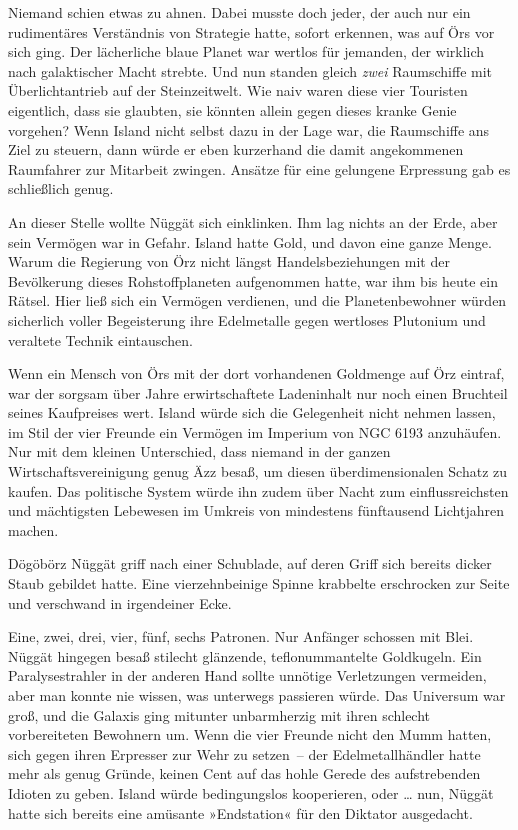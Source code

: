 Niemand schien etwas zu ahnen. Dabei musste doch jeder, der auch nur ein rudimentäres Verständnis von Strategie hatte, sofort erkennen, was auf Örs vor sich ging. Der lächerliche blaue Planet war wertlos für jemanden, der wirklich nach galaktischer Macht strebte. Und nun standen gleich \emph{zwei} Raumschiffe mit Überlichtantrieb auf der Steinzeitwelt. Wie naiv waren diese vier Touristen eigentlich, dass sie glaubten, sie könnten allein gegen dieses kranke Genie vorgehen? Wenn Island nicht selbst dazu in der Lage war, die Raumschiffe ans Ziel zu steuern, dann würde er eben kurzerhand die damit angekommenen Raumfahrer zur Mitarbeit zwingen. Ansätze für eine gelungene Erpressung gab es schließlich genug.

An dieser Stelle wollte Nüggät sich einklinken. Ihm lag nichts an der Erde, aber sein Vermögen war in Gefahr. Island hatte Gold, und davon eine ganze Menge. Warum die Regierung von Örz nicht längst Handelsbeziehungen mit der Bevölkerung dieses Rohstoffplaneten aufgenommen hatte, war ihm bis heute ein Rätsel. Hier ließ sich ein Vermögen verdienen, und die Planetenbewohner würden sicherlich voller Begeisterung ihre Edelmetalle gegen wertloses Plutonium und veraltete Technik eintauschen.

Wenn ein Mensch von Örs mit der dort vorhandenen Goldmenge auf Örz eintraf, war der sorgsam über Jahre erwirtschaftete Ladeninhalt nur noch einen Bruchteil seines Kaufpreises wert. Island würde sich die Gelegenheit nicht nehmen lassen, im Stil der vier Freunde ein Vermögen im Imperium von NGC 6193 anzuhäufen. Nur mit dem kleinen Unterschied, dass niemand in der ganzen Wirtschaftsvereinigung genug Äzz besaß, um diesen überdimensionalen Schatz zu kaufen. Das politische System würde ihn zudem über Nacht zum einflussreichsten und mächtigsten Lebewesen im Umkreis von mindestens fünftausend Lichtjahren machen.

Dögöbörz Nüggät griff nach einer Schublade, auf deren Griff sich bereits dicker Staub gebildet hatte. Eine vierzehnbeinige Spinne krabbelte erschrocken zur Seite und verschwand in irgendeiner Ecke.

Eine, zwei, drei, vier, fünf, sechs Patronen. Nur Anfänger schossen mit Blei. Nüggät hingegen besaß stilecht glänzende, teflonummantelte Goldkugeln. Ein Paralysestrahler in der anderen Hand sollte unnötige Verletzungen vermeiden, aber man konnte nie wissen, was unterwegs passieren würde. Das Universum war groß, und die Galaxis ging mitunter unbarmherzig mit ihren schlecht vorbereiteten Bewohnern um. Wenn die vier Freunde nicht den Mumm hatten, sich gegen ihren Erpresser zur Wehr zu setzen~– der Edelmetallhändler hatte mehr als genug Gründe, keinen Cent auf das hohle Gerede des aufstrebenden Idioten zu geben. Island würde bedingungslos kooperieren, oder … nun, Nüggät hatte sich bereits eine amüsante »Endstation« für den Diktator ausgedacht.

